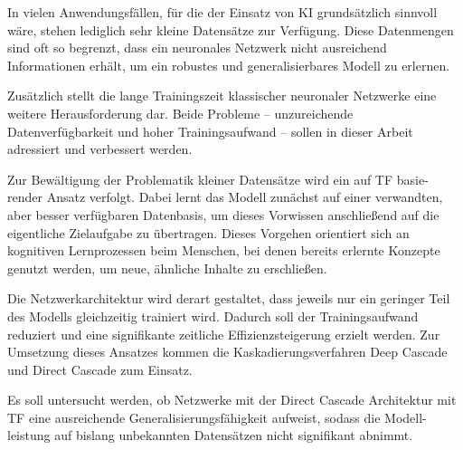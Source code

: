 In vielen Anwendungsfällen, für die der Einsatz von KI grundsätzlich sinnvoll wäre, stehen lediglich sehr kleine Datensätze 
zur Verfügung. Diese Datenmengen sind oft so begrenzt, dass ein neuronales Netzwerk nicht ausreichend Informationen erhält, um ein robustes und 
generalisierbares Modell zu erlernen. %

Zusätzlich stellt die lange Trainingszeit klassischer neuronaler Netzwerke eine weitere Herausforderung dar. Beide Probleme – unzureichende 
Datenverfügbarkeit und hoher Trainingsaufwand – sollen in dieser Arbeit adressiert und verbessert werden.

Zur Bewältigung der Problematik kleiner Datensätze wird ein auf TF basie-render Ansatz verfolgt. Dabei lernt das Modell zunächst 
auf einer verwandten, aber besser verfügbaren Datenbasis, um dieses Vorwissen anschließend auf die eigentliche Zielaufgabe zu übertragen. Dieses 
Vorgehen orientiert sich an kognitiven Lernprozessen beim Menschen, bei denen bereits erlernte Konzepte genutzt werden, um neue, ähnliche 
Inhalte zu erschließen. %

Die Netzwerkarchitektur wird derart gestaltet, dass jeweils nur ein geringer Teil des Modells gleichzeitig trainiert wird. Dadurch soll der 
Trainingsaufwand reduziert und eine signifikante zeitliche Effizienzsteigerung erzielt werden. Zur Umsetzung dieses Ansatzes kommen die 
Kaskadierungsverfahren Deep Cascade und Direct Cascade zum Einsatz.

Es soll untersucht werden, ob Netzwerke mit der Direct Cascade Architektur mit TF eine ausreichende 
Generalisierungsfähigkeit aufweist, sodass die Modell-leistung auf bislang unbekannten Datensätzen nicht signifikant abnimmt.
